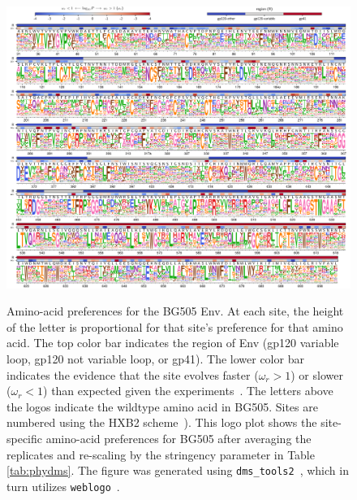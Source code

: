 \documentclass[9pt]{elife}
\begin{document}
\begin{figure}
\begin{fullwidth}
{\includegraphics[width=1.3\textwidth]{figures/BG505_prefs.pdf}}
\caption{\label{fig:BG505prefs}
Amino-acid preferences for the BG505 Env.
At each site, the height of the letter is proportional for that site's preference for that amino acid.
The top color bar indicates the region of Env (gp120 variable loop, gp120 not variable loop, or gp41).
The lower color bar indicates the evidence that the site evolves faster ($\omega_r > 1$) or slower ($\omega_r < 1$) than expected given the experiments~\citep[see][]{bloom2017identification}.
The letters above the logos indicate the wildtype amino acid in BG505.
Sites are numbered using the HXB2 scheme~\citep{korber1998numbering}).
This logo plot shows the site-specific amino-acid preferences for BG505 after averaging the replicates and re-scaling by the stringency parameter in Table \ref{tab:phydms}.
The figure was generated using \texttt{dms\_tools2}~\citep[\url{https://jbloomlab.github.io/dms_tools2/}]{bloom2015software}, which in turn utilizes \texttt{weblogo}~\citep{crooks2004weblogo}.
}
\end{fullwidth}
\end{figure}
\end{document}
